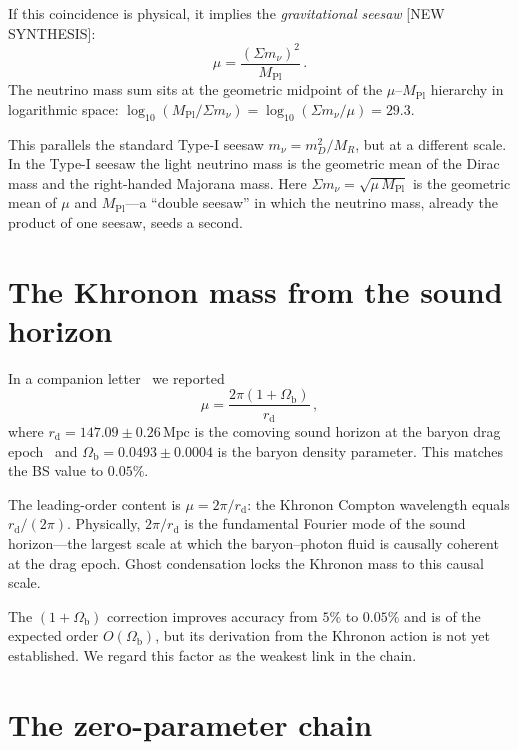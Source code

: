 \documentclass[prl,twocolumn,superscriptaddress,longbibliography]{revtex4-2}
\newcommand{\Mpc}{\,\mathrm{Mpc}}
\newcommand{\rd}{r_{\mathrm{d}}}
\newcommand{\Ob}{\Omega_{\mathrm{b}}}
\newcommand{\MPl}{M_{\mathrm{Pl}}}
\newcommand{\sumnu}{\Sigma m_\nu}
\begin{document}
If this coincidence is physical, it implies the \textit{gravitational seesaw}
[NEW SYNTHESIS]:
\begin{equation}\label{eq:seesaw}
  \boxed{\mu = \frac{(\sumnu)^2}{\MPl}} \,.
\end{equation}
The neutrino mass sum sits at the geometric midpoint
of the $\mu$--$\MPl$ hierarchy in logarithmic space:
$\log_{10}(\MPl/\sumnu) = \log_{10}(\sumnu/\mu) = 29.3$.

This parallels the standard Type-I seesaw $m_\nu = m_D^2/M_R$,
but at a different scale.
In the Type-I seesaw the light neutrino mass is the geometric
mean of the Dirac mass and the right-handed Majorana mass.
Here $\sumnu = \sqrt{\mu\,\MPl}$ is the geometric mean
of $\mu$ and $\MPl$---a ``double seesaw'' in which the neutrino mass,
already the product of one seesaw, seeds a second.

\section{The Khronon mass from the sound horizon}

In a companion letter~\cite{PaperA0} we reported
\begin{equation}\label{eq:mu_rd}
  \mu = \frac{2\pi(1+\Ob)}{\rd} \,,
\end{equation}
where $\rd = 147.09 \pm 0.26\Mpc$ is the comoving sound horizon
at the baryon drag epoch~\cite{Planck2018} and
$\Ob = 0.0493 \pm 0.0004$ is the baryon density parameter.
This matches the BS value to $0.05\%$.

The leading-order content is $\mu = 2\pi/\rd$:
the Khronon Compton wavelength equals $\rd/(2\pi)$.
Physically, $2\pi/\rd$ is the fundamental Fourier mode
of the sound horizon---the largest scale at which the
baryon--photon fluid is causally coherent at the drag epoch.
Ghost condensation locks the Khronon mass to this causal scale.

The $(1+\Ob)$ correction improves accuracy from $5\%$
to $0.05\%$ and is of the expected order $O(\Ob)$,
but its derivation from the Khronon action
is not yet established. We regard this factor as the
weakest link in the chain.

\section{The zero-parameter chain}
\end{document}
